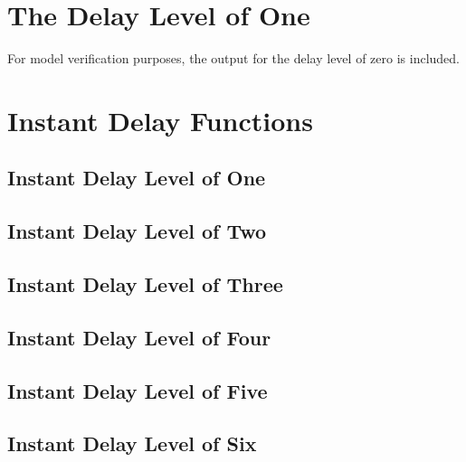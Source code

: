 \section{The Delay Level of One}
For model verification purposes, the output for the delay level of zero is included.

\begin{small}
\end{small}

 \newpage
\section{Instant Delay Functions}

\subsection{Instant Delay Level of One}

\subsection{Instant Delay Level of Two}

\subsection{Instant Delay Level of Three}

\subsection{Instant Delay Level of Four}

\subsection{Instant Delay Level of Five}

\subsection{Instant Delay Level of Six}



